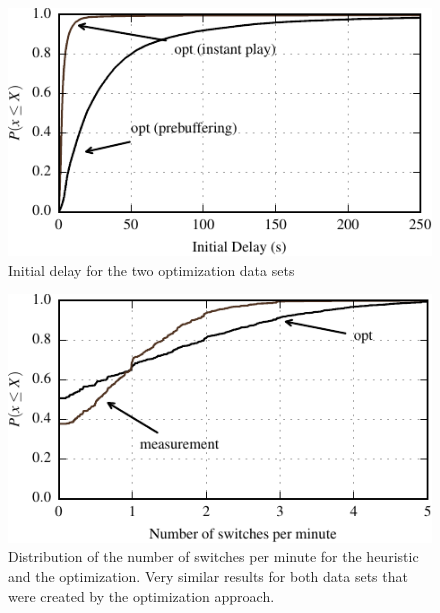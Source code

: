 \begin{figure}[t]
\centering
\includegraphics[width=1.02\columnwidth]{figs/initial_delay_py}%
\caption{Initial delay for the two optimization data sets}
\label{fig:initial_delay}%
\end{figure}

\begin{figure}[t]
\centering
\includegraphics[width=\columnwidth]{figs/switches_py}%
\caption{Distribution of the number of switches per minute for the heuristic and the optimization. Very similar results for both data sets that were created by the optimization approach.}
\label{fig:switches}%
\end{figure}

